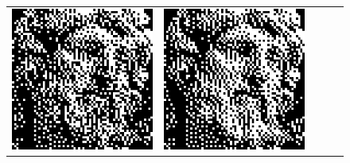 \begin{figure}
\begin{tabular}{c c c c c}
		\includegraphics[width=\tilewidth,interpolate=false]{media/chp2/associative_memory/hopfield/04_03_activation_scaled_crushed.png}&%
		\includegraphics[width=\tilewidth,interpolate=false]{media/chp2/associative_memory/hopfield/04_04_activation_scaled_crushed.png}\\%

\end{tabular}
\end{figure}
